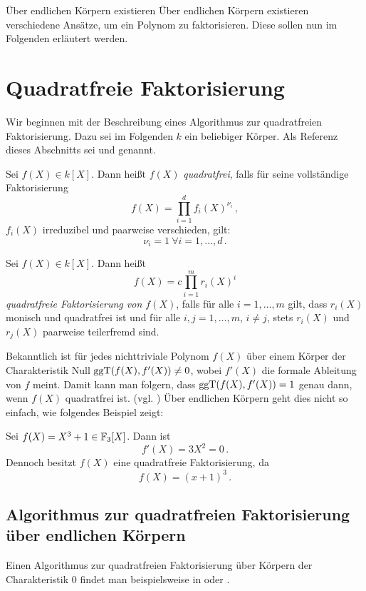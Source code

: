 Über endlichen Körpern existieren Über endlichen Körpern existieren 
verschiedene Ansätze, um ein Polynom zu faktorisieren. Diese sollen nun im
Folgenden erläutert werden.

\section{Quadratfreie Faktorisierung}
Wir beginnen mit der Beschreibung eines Algorithmus zur quadratfreien 
Faktorisierung. Dazu sei im Folgenden $k$ ein beliebiger Körper. 
Als Referenz dieses Abschnitts sei 
\autocite[Section 9]{cohan:algebra} und \autocite[Section
8.3]{geddes:algorithms} genannt.


\begin{definition}[quadratfrei]
  Sei $f(X) \in k[X]$. Dann heißt $f(X)$ \emph{quadratfrei},
  falls für seine vollständige Faktorisierung
  \[ f(X) = \prod_{i=1}^d f_i(X)^{\nu_i}\,,\]
  $f_i(X)$ irreduzibel und paarweise verschieden, gilt:
  \[ \nu_i = 1 \ \forall i=1,\ldots,d\,.\]
\end{definition}

\begin{definition}
  Sei $f(X) \in k[X]$. Dann heißt
  \[ f(X) = c \prod_{i=1}^m r_i(X)^i\]
  \emph{quadratfreie Faktorisierung von $f(X)$}, falls
  für alle $i=1,\ldots,m$ gilt, dass $r_i(X)$ monisch und quadratfrei ist und
  für alle $i,j=1,\ldots,m$, $i\neq j$, stets $r_i(X)$ und $r_j(X)$ paarweise
  teilerfremd sind.
\end{definition}

Bekanntlich ist für jedes nichttriviale Polynom $f(X)$ über einem Körper der
Charakteristik Null $\operatorname{ggT}(f(X),f'(X)) \neq 0$, wobei $f'(X)$ die formale
Ableitung von $f$ meint. Damit kann man folgern, dass $\operatorname{ggT}(f(X),f'(X)) = 1$
genau dann, wenn $f(X)$ quadratfrei ist. (vgl. \autocites[Theorem
9.4]{cohan:algebra}[Theorem 9.5]{cohan:algebra}) Über endlichen Körpern geht
dies nicht so einfach, wie folgendes Beispiel zeigt:

\begin{beispiel}
  Sei $f(X) = X^3+1 \in \mathbb{F}_3[X]$. Dann ist 
  \[ f'(X) = 3 X^2 = 0 \,. \]
  Dennoch besitzt $f(X)$ eine quadratfreie Faktorisierung, da
  \[ f(X) = (x+1)^3\,.\]
\end{beispiel}


\subsection{Algorithmus zur quadratfreien Faktorisierung über endlichen
Körpern}
Einen Algorithmus zur quadratfreien Faktorisierung über Körpern der
Charakteristik $0$ findet man beispielsweise in \autocite[Figure 9.1]{cohen:algebra}
oder \autocite[Algorithm 8.2]{geddes:algorithms}.

